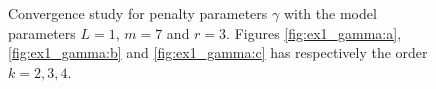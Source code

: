 \begin{figure}
    \caption{ Convergence study for penalty parameters $\gamma$ with the model parameters $L=1$, $m=7$ and $r=3$. Figures \ref{fig:ex1_gamma:a}, \ref{fig:ex1_gamma:b} and \ref{fig:ex1_gamma:c} has respectively the order $k=2,3, 4$.  }
    \label{fig:ex1_gamma}
\end{figure}


